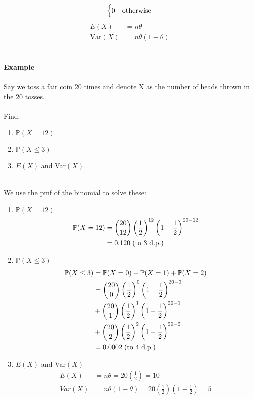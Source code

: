 \documentclass[,oneside]{article}
\begin{document}
\begin{enumerate}
\[\begin{cases}
0 & $otherwise$
\end{cases} \] 
\begin{align*}
E(X)&=n\theta\\
\text{Var}(X)&=n\theta(1-\theta)
\end{align*}\\ \\
\textbf{Example}\\ \\
Say we toss a fair coin 20 times and denote X as the number of heads thrown in the 20 tosses. \\ \\
Find:
\begin{enumerate}
\item $\mathbb{P}(X=12)$
\item $\mathbb{P}(X \leq 3)$
\item $E(X)$ and Var$(X)$
\end{enumerate}\\
We use the pmf of the binomial to solve these:
\begin{enumerate}
\item $\mathbb{P}(X=12)$
\begin{align*}
\mathbb{P}(X=12) &= \binom{20}{12} \left (\frac{1}{2} \right )^{12} \left (1-\frac{1}{2} \right )^{20-12}\\
&= 0.120 \hspace{0.1cm} (\text{to 3 d.p.})
\end{align*}
\item $\mathbb{P}(X \leq 3)$
\begin{align*}
\mathbb{P}(X\leq 3) &= \mathbb{P}(X=0)+\mathbb{P}(X=1)+\mathbb{P}(X=2)\\
&= \binom{20}{0} \left (\frac{1}{2} \right )^{0} \left (1-\frac{1}{2} \right )^{20-0}\\
&+ \binom{20}{1} \left (\frac{1}{2}\right )^{1} \left (1-\frac{1}{2} \right )^{20-1}\\
&+ \binom{20}{2} \left (\frac{1}{2}\right )^{2} \left (1-\frac{1}{2} \right )^{20-2}\\
&= 0.0002 \hspace{0.1cm} (\text{to 4 d.p.})
\end{align*}
\item $E(X)$ and Var$(X)$
\begin{align*}
E(X) &= n\theta = 20 \left ( \frac{1}{2} \right ) = 10\\
Var(X) &= n\theta(1-\theta) = 20 \left ( \frac{1}{2} \right ) \left (1-\frac{1}{2} \right ) = 5
\end{align*}

\end{enumerate}
\end{enumerate}
\end{document}

